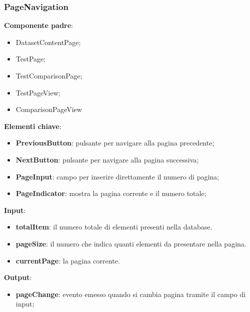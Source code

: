 \subsubsection{PageNavigation}
\textbf{Componente padre}:
\begin{itemize}
    \item DatasetContentPage;
    \item TestPage;
    \item TestComparisonPage;
    \item TestPageView;
    \item ComparisonPageView
\end{itemize}
\textbf{Elementi chiave}:
\begin{itemize}
    \item \textbf{PreviousButton}: pulsante per navigare alla pagina precedente;
    \item \textbf{NextButton}: pulsante per navigare alla pagina successiva;
    \item \textbf{PageInput}: campo per inserire direttamente il numero di pagina;
    \item \textbf{PageIndicator}: mostra la pagina corrente e il numero totale;
\end{itemize}
\textbf{Input}:
\begin{itemize}
    \item \textbf{totalItem}: il numero totale di elementi presenti nella database.
    \item \textbf{pageSize}: il numero che indica quanti elementi da presentare nella pagina.
    \item \textbf{currentPage}: la pagina corrente.
\end{itemize}
\textbf{Output}:
\begin{itemize}
    \item \textbf{pageChange}: evento emesso quando si cambia pagina tramite il campo di input;
\end{itemize}
